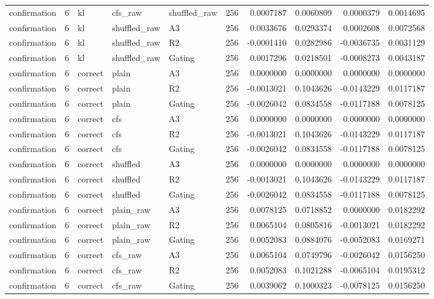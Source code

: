 \begin{tabular}{lrlllrrrrr}
confirmation & 6 & kl & cfs_raw & shuffled_raw & 256 & 0.0007187 & 0.0060809 & 0.0000379 & 0.0014695 \\
confirmation & 6 & kl & shuffled_raw & A3 & 256 & 0.0033676 & 0.0293374 & 0.0002608 & 0.0072568 \\
confirmation & 6 & kl & shuffled_raw & R2 & 256 & -0.0001410 & 0.0282986 & -0.0036735 & 0.0031129 \\
confirmation & 6 & kl & shuffled_raw & Gating & 256 & 0.0017296 & 0.0218501 & -0.0008273 & 0.0043187 \\
confirmation & 6 & correct & plain & A3 & 256 & 0.0000000 & 0.0000000 & 0.0000000 & 0.0000000 \\
confirmation & 6 & correct & plain & R2 & 256 & -0.0013021 & 0.1043626 & -0.0143229 & 0.0117187 \\
confirmation & 6 & correct & plain & Gating & 256 & -0.0026042 & 0.0834558 & -0.0117188 & 0.0078125 \\
confirmation & 6 & correct & cfs & A3 & 256 & 0.0000000 & 0.0000000 & 0.0000000 & 0.0000000 \\
confirmation & 6 & correct & cfs & R2 & 256 & -0.0013021 & 0.1043626 & -0.0143229 & 0.0117187 \\
confirmation & 6 & correct & cfs & Gating & 256 & -0.0026042 & 0.0834558 & -0.0117188 & 0.0078125 \\
confirmation & 6 & correct & shuffled & A3 & 256 & 0.0000000 & 0.0000000 & 0.0000000 & 0.0000000 \\
confirmation & 6 & correct & shuffled & R2 & 256 & -0.0013021 & 0.1043626 & -0.0143229 & 0.0117187 \\
confirmation & 6 & correct & shuffled & Gating & 256 & -0.0026042 & 0.0834558 & -0.0117188 & 0.0078125 \\
confirmation & 6 & correct & plain_raw & A3 & 256 & 0.0078125 & 0.0718852 & 0.0000000 & 0.0182292 \\
confirmation & 6 & correct & plain_raw & R2 & 256 & 0.0065104 & 0.0805816 & -0.0013021 & 0.0182292 \\
confirmation & 6 & correct & plain_raw & Gating & 256 & 0.0052083 & 0.0884076 & -0.0052083 & 0.0169271 \\
confirmation & 6 & correct & cfs_raw & A3 & 256 & 0.0065104 & 0.0749796 & -0.0026042 & 0.0156250 \\
confirmation & 6 & correct & cfs_raw & R2 & 256 & 0.0052083 & 0.1021288 & -0.0065104 & 0.0195312 \\
confirmation & 6 & correct & cfs_raw & Gating & 256 & 0.0039062 & 0.1000323 & -0.0078125 & 0.0156250 \\

\end{tabular}
